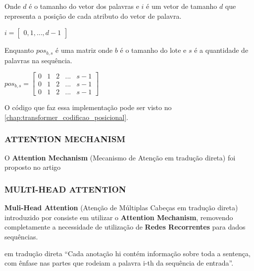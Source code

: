 Onde $d$ é o tamanho do vetor dos palavras e $i$ é um vetor de tamanho $d$ que representa a posição de cada atributo do vetor de palavra.

\begin{center}
    $i = \begin{bmatrix} 0, 1, ..., d-1 \end{bmatrix}$
\end{center}

Enquanto $pos_{b,s}$ é uma matriz onde $b$ é o tamanho do lote e $s$ é a quantidade de palavras na sequência.

\begin{center}
    $pos_{b, s} = \begin{bmatrix}
    0 & 1 & 2 & ... & s-1 \\
    0 & 1 & 2 & ... & s-1 \\
    0 & 1 & 2 & ... & s-1
    \end{bmatrix}$
\end{center}

O código que faz essa implementação pode ser visto no \autoref{chap:transformer_codificao_posicional}.

\subsubsection{ATTENTION MECHANISM}

O \textbf{Attention Mechanism} (Mecanismo de Atenção em tradução direta) foi proposto no artigo \cite{attention} 

\subsubsection{MULTI-HEAD ATTENTION}

\textbf{Muli-Head Attention} (Atenção de Múltiplas Cabeças em tradução direta) introduzido por \cite{transformer} consiste em utilizar o \textbf{Attention Mechanism}, removendo completamente a necessidade de utilização de \textbf{Redes Recorrentes} para dados sequências.




em tradução direta “Cada anotação hi contém informação sobre toda a sentença, com ênfase nas partes que rodeiam a palavra i-th da sequência de entrada”.

